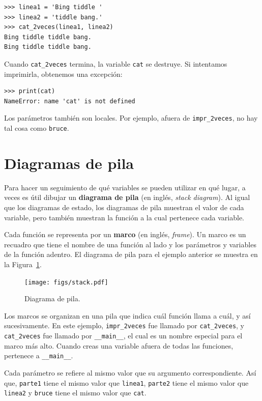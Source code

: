 \documentclass[10pt]{book}
\begin{document}
\begin{verbatim}
>>> linea1 = 'Bing tiddle '
>>> linea2 = 'tiddle bang.'
>>> cat_2veces(linea1, linea2)
Bing tiddle tiddle bang.
Bing tiddle tiddle bang.
\end{verbatim}
%
Cuando \verb"cat_2veces" termina, la variable {\tt cat}
se destruye.  Si intentamos imprimirla, obtenemos una excepción:

\begin{verbatim}
>>> print(cat)
NameError: name 'cat' is not defined
\end{verbatim}
%
Los parámetros también son locales.
Por ejemplo, afuera de \verb"impr_2veces", no hay
tal cosa como {\tt bruce}.


\section{Diagramas de pila}
\label{stackdiagram}

Para hacer un seguimiento de qué variables se pueden utilizar en qué lugar, a veces es
útil dibujar un {\bf diagrama de pila} (en inglés, {\em stack diagram}).  Al igual que los diagramas de estado,
los diagramas de pila muestran el valor de cada variable, pero también muestran la
función a la cual pertenece cada variable.

Cada función se representa por un {\bf marco} (en inglés, {\em frame}).  Un marco es un recuadro que tiene
el nombre de una función al lado y los parámetros y variables de
la función adentro.  El diagrama de pila para el ejemplo anterior se
muestra en la Figura~\ref{fig.stack}.

\begin{figure}
\centerline
{\texttt{[image: figs/stack.pdf]}}
\caption{Diagrama de pila.}
\label{fig.stack}
\end{figure}


Los marcos se organizan en una pila que indica cuál función
llama a cuál, y así sucesivamente.  En este ejemplo, \verb"impr_2veces"
fue llamado por \verb"cat_2veces", y \verb"cat_2veces" fue llamado por
\verb"__main__", el cual es un nombre especial para el marco más alto.  Cuando
creas una variable afuera de todas las funciones, pertenece a
\verb"__main__".


Cada parámetro se refiere al mismo valor que su argumento
correspondiente.  Así que, {\tt parte1} tiene el mismo valor que
{\tt linea1}, {\tt parte2} tiene el mismo valor que {\tt linea2}
y {\tt bruce} tiene el mismo valor que {\tt cat}.
\end{document}
